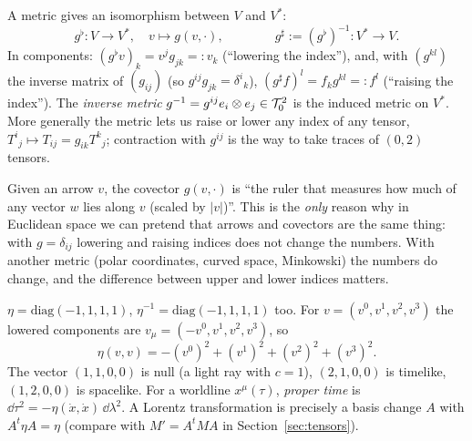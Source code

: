 \begin{formal}
A metric gives an isomorphism between $V$ and $V^*$:
\[
g^\flat:V\to V^*,\quad v\mapsto g(v,\cdot),\qquad\qquad g^\sharp:=(g^\flat)^{-1}:V^*\to V.
\]
In components: $(g^\flat v)_k=v^jg_{jk}=:v_k$ (``lowering the index''), and, with $(g^{kl})$ the inverse matrix of $(g_{ij})$ (so $g^{ij}g_{jk}=\delta^i{}_k$), $(g^\sharp f)^l=f_kg^{kl}=:f^l$ (``raising the index''). The \emph{inverse metric} $g^{-1}=g^{ij}e_i\otimes e_j\in\mathcal{T}^{2}_{0}$ is the induced metric on $V^*$. More generally the metric lets us raise or lower any index of any tensor, \eg $T^i{}_j\mapsto T_{ij}=g_{ik}T^k{}_j$; contraction with $g^{ij}$ is the way to take traces of $(0,2)$ tensors.
\end{formal}

\begin{intuition}
Given an arrow $v$, the covector $g(v,\cdot)$ is ``the ruler that measures how much of any vector $w$ lies along $v$ (scaled by $|v|$)''. This is the \emph{only} reason why in Euclidean space we can pretend that arrows and covectors are the same thing: with $g=\delta_{ij}$ lowering and raising indices does not change the numbers. With another metric (polar coordinates, curved space, Minkowski) the numbers do change, and the difference between upper and lower indices matters.
\end{intuition}

\begin{example}
$\eta=\mathrm{diag}(-1,1,1,1)$, $\eta^{-1}=\mathrm{diag}(-1,1,1,1)$ too. For $v=(v^0,v^1,v^2,v^3)$ the lowered components are $v_\mu=(-v^0,v^1,v^2,v^3)$, so
\[
\eta(v,v)=-(v^0)^2+(v^1)^2+(v^2)^2+(v^3)^2.
\]
The vector $(1,1,0,0)$ is null (a light ray with $c=1$), $(2,1,0,0)$ is timelike, $(1,2,0,0)$ is spacelike. For a worldline $x^\mu(\tau)$, \emph{proper time} is $\dd\tau^2=-\eta(\dot x,\dot x)\,\dd\lambda^2$. A Lorentz transformation is precisely a basis change $A$ with $A^t\eta A=\eta$ (compare with $M'=A^tMA$ in Section~\ref{sec:tensors}).
\end{example}

